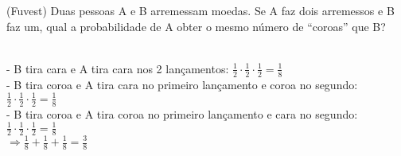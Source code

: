 \begin{ex} (Fuvest) Duas pessoas A e B
 arremessam moedas. Se A faz dois arremessos e B faz um, qual a probabilidade de A obter o mesmo número de “coroas” que B?
  \begin{sol}
  \phantom{A} \\
  - B tira cara e A tira cara nos 2 lançamentos:\hspace{0,3cm} $\frac{1}{2}\cdot\frac{1}{2}\cdot\frac{1}{2}=\frac{1}{8}$\\
  - B tira coroa e A tira cara no primeiro lançamento e coroa no segundo:\hspace{0,3cm} $\frac{1}{2}\cdot\frac{1}{2}\cdot\frac{1}{2}=\frac{1}{8}$\\
  - B tira coroa e A tira coroa no primeiro lançamento e cara no segundo:\hspace{0,3cm} $\frac{1}{2}\cdot\frac{1}{2}\cdot\frac{1}{2}=\frac{1}{8}$\\
  $\Longrightarrow \frac{1}{8}+\frac{1}{8}+\frac{1}{8}= \frac{3}{8}$
  \end{sol}
\end{ex}
